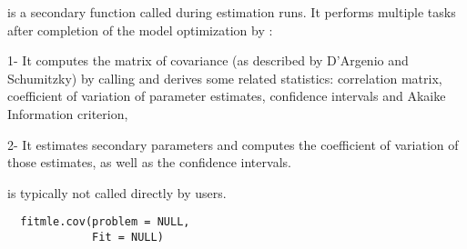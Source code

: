 %
\begin{Description}\relax
{} is a secondary function called during estimation runs. It 
performs multiple tasks after completion of the model optimization by
:

1- It computes the matrix of covariance (as described by D'Argenio and 
Schumitzky) by calling  and derives some related
statistics: correlation matrix, coefficient of variation of parameter
estimates, confidence intervals and Akaike Information criterion,

2- It estimates secondary parameters and computes the coefficient of variation
of those estimates, as well as the confidence intervals.

 is typically not called directly by users.

\end{Description}
%
\begin{Usage}
\begin{verbatim}
  fitmle.cov(problem = NULL,
             Fit = NULL)
\end{verbatim}
\end{Usage}
%
